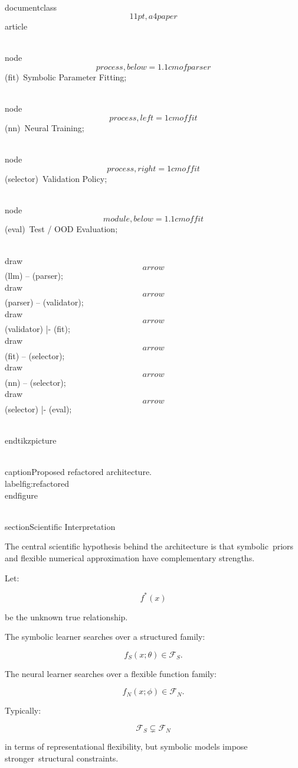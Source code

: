 \\documentclass\[11pt,a4paper\]{article}
\begin{document}
 \\node\[process,below=1.1cm of parser\] (fit)\
 {Symbolic Parameter Fitting};

 \\node\[process,left=1cm of fit\] (nn)\
 {Neural Training};

 \\node\[process,right=1cm of fit\] (selector)\
 {Validation Policy};

 \\node\[module,below=1.1cm of fit\] (eval)\
 {Test / OOD Evaluation};

 \\draw\[arrow\] (llm) -- (parser);\
 \\draw\[arrow\] (parser) -- (validator);\
 \\draw\[arrow\] (validator) |- (fit);\
 \\draw\[arrow\] (fit) -- (selector);\
 \\draw\[arrow\] (nn) -- (selector);\
 \\draw\[arrow\] (selector) |- (eval);

 \\end{tikzpicture}

 \\caption{Proposed refactored architecture.}\
 \\label{fig:refactored}\
 \\end{figure}

 \\section{Scientific Interpretation}\

 The central scientific hypothesis behind the architecture is that symbolic\
 priors and flexible numerical approximation have complementary strengths.

 Let:

 $$
f^*(x)
$$

 be the unknown true relationship.

 The symbolic learner searches over a structured family:

 $$
f_S(x;\theta)
\in
\mathcal F_S.
$$

 The neural learner searches over a flexible function family:

 $$
f_N(x;\phi)
\in
\mathcal F_N.
$$

 Typically:

 $$
\mathcal F_S
\subsetneq
\mathcal F_N
$$

 in terms of representational flexibility, but symbolic models impose stronger\
 structural constraints.
\end{document}
